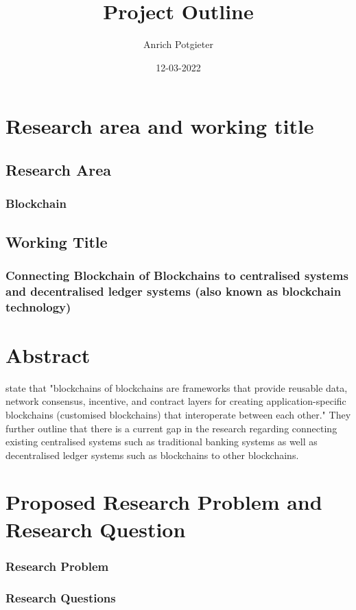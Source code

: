 \documentclass[12pt]{article}
\title{Project Outline}
\author{Anrich Potgieter}
\date{12-03-2022}
\begin{document}
\maketitle
\tableofcontents

\section{Research area and working title}
\subsection{Research Area}
\subsubsection{Blockchain}

\subsection{Working Title}
\subsubsection{Connecting Blockchain of Blockchains to centralised systems and decentralised ledger systems (also known as blockchain technology)}


\section{Abstract}
\autocite{belchiorSurveyBlockchainInteroperability2021}
state that "blockchains of blockchains are frameworks that provide reusable data, network consensus, incentive, 
and contract layers for creating application-specific blockchains (customised blockchains) that interoperate between each other."
They further outline that there is a current gap in the research regarding connecting existing centralised systems such as traditional banking
systems as well as decentralised ledger systems such as blockchains to other blockchains.

\section{Proposed Research Problem and Research Question}
\subsubsection{Research Problem}

\subsubsection{Research Questions}
\end{document}
